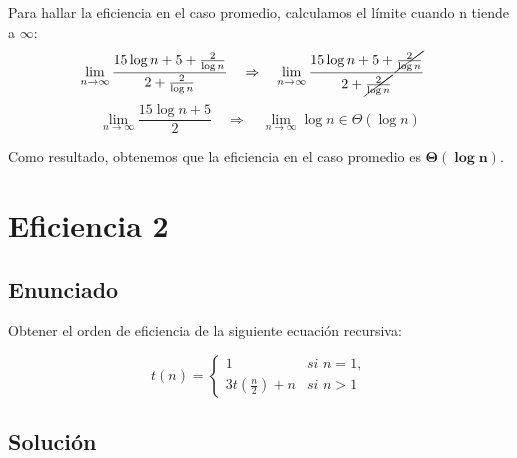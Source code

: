 \documentclass[10pt,a4paper,spanish]{report}
\theoremstyle{definition}
\theoremstyle{remark}
\begin{document}
\begin{center}
Para hallar la eficiencia en el caso promedio, calculamos el límite cuando n tiende a $\infty$:
\begin{displaymath}
  \lim_{n\rightarrow \infty} \frac{15\log n + 5 + \frac{2}{\log n}}{2 + \frac{2}{\log n}} \quad \Rightarrow \quad \lim_{n\rightarrow \infty} \frac{15\log n + 5 + \cancel{\frac{2}{\log n}}}{2 + \cancel{\frac{2}{\log n}}} \quad 
\end{displaymath}
\begin{displaymath}
 \lim_{n\rightarrow \infty} \frac{15 \log n + 5}{2} \quad \Rightarrow \quad \lim_{n\rightarrow \infty} \log n \in \Theta(\log n)
\end{displaymath}
\end{center}
Como resultado, obtenemos que la eficiencia en el caso promedio es $\mathbf{\Theta(\log n)}$.

\section{\textcolor[rgb]{0.1,0.2,1}Eficiencia 2}

\subsection{\textcolor[rgb]{0.1,0.2,1}Enunciado}

Obtener el orden de eficiencia de la siguiente ecuación recursiva:

\begin{equation*}
t(n) = 
\begin{cases}
1 & \textit{si } n = 1, \\
3t(\frac{n}{2}) + n & \textit{si } n > 1
\end{cases}
\end{equation*}

\subsection{\textcolor[rgb]{0.1,0.2,1}Solución}
\end{document}
